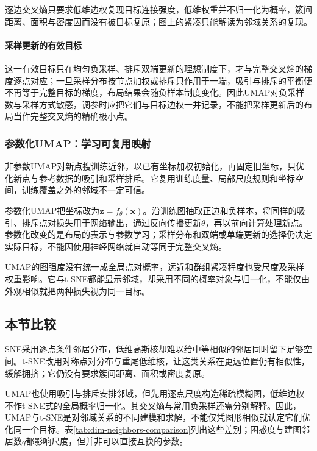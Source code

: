 逐边交叉熵只要求低维边权复现目标连接强度，低维权重并不归一化为概率，簇间距离、面积与密度因而没有被目标复原；图上的紧凑只能解读为邻域关系的复现。

\paragraph{采样更新的有效目标}

这一有效目标只在均匀负采样、排斥双端更新的理想制度下，才与完整交叉熵的梯度逐点对应；一旦采样分布按节点加权或排斥只作用于一端，吸引与排斥的平衡便不再等于完整目标的梯度，布局结果会随负样本制度变化。因此UMAP对负采样数与采样方式敏感，调参时应把它们与目标边权一并记录，不能把采样更新后的布局当作完整交叉熵的精确极小点。

\subsubsection{参数化UMAP：学习可复用映射}

非参数UMAP对新点搜训练近邻，以已有坐标加权初始化，再固定旧坐标，只优化新点与参考数据的吸引和采样排斥。它复用训练度量、局部尺度规则和坐标空间，训练覆盖之外的邻域不一定可信。

参数化UMAP把坐标改为$\bm z=f_\theta(\bm x)$。沿训练图抽取正边和负样本，将同样的吸引、排斥点对损失用于网络输出，通过反向传播更新$\theta$，再以前向计算处理新点。参数化改变的是布局的表示与参数学习；采样分布和双端或单端更新的选择仍决定实际目标，不能因使用神经网络就自动等同于完整交叉熵。

UMAP的图强度没有统一成全局点对概率，远近和群组紧凑程度也受尺度及采样权重影响。它与t-SNE都能显示邻域，却采用不同的概率对象与归一化，不能仅由外观相似就把两种损失视为同一目标。

\subsection{本节比较}
\label{sec:dim-neighbors-comparison}

SNE采用逐点条件邻居分布，低维高斯核却难以给中等相似的邻居同时留下足够空间。t-SNE改用对称点对分布与重尾低维核，让这类关系在更远位置仍有相似性，缓解拥挤；它仍没有要求簇间距离、面积或密度复原。

UMAP也使用吸引与排斥安排邻域，但先用逐点尺度构造稀疏模糊图，低维边权不作t-SNE式的全局概率归一化。其交叉熵与常用负采样还需分别解释。因此，UMAP与t-SNE是对邻域关系的不同建模和求解，不能仅凭图形相似就认定它们优化同一个目标。表\ref{tab:dim-neighbors-comparison}列出这些差别；困惑度与建图邻居数$q$都影响尺度，但并非可以直接互换的参数。


